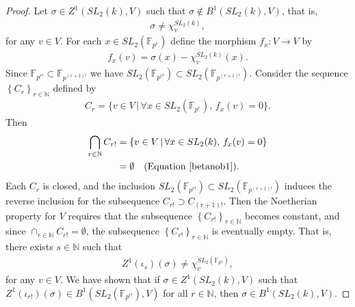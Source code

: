 \begin{proof}
Let $\sigma\in Z^1(SL_2(k), V)$ such that $\sigma \notin B^1(SL_2(k), V)$, that is,
\begin{align}\label{betanob1}
	\sigma \neq \chi^{SL_2(k)}_v,
\end{align}
for any $v \in V$. For each $x\in SL_2(\mathbb{F}_{p^r})$ define the morphism $f_x:V\rightarrow V$ by
	\begin{align*}
		f_x(v) = \sigma(x) - \chi^{SL_2(k)}_v(x).
	\end{align*}
Since $\mathbb{F}_{p^{r!}} \subset \mathbb{F}_{p^{(r+1)!}}$ we have $SL_2(\mathbb{F}_{p^{r!}}) \subset SL_2(\mathbb{F}_{p^{(r+1)!}})$.
Consider the sequence $\left\{C_{r}\right\}_{r \in \mathbb{N}}$ defined by
	\begin{align*}
		C_{r} = \{v \in V \,|\,\forall x\in SL_2(\mathbb{F}_{p^{r}}),\, f_x(v) = 0\}.
	\end{align*}
	Then
\begin{align*}
	\bigcap_{r\in \mathbb{N}}C_{r!} &= \{v \in V \,|\, \forall x \in SL_2(k),\, f_x(v) = 0\} \\
		&= \emptyset \quad(\textrm{Equation \ref{betanob1}}).
\end{align*}
	Each $C_{r}$ is closed, and the inclusion $SL_2(\mathbb{F}_{p^{r!}}) \subset SL_2(\mathbb{F}_{p^{(r+1)!}})$ induces the reverse inclusion for the subsequence $C_{r!} \supset C_{(r+1)!}$.
Then the Noetherian property for $V$ requires that the subsequence $\left\{C_{r!}\right\}_{r \in \mathbb{N}}$ becomes constant, and since $\cap_{r\in\mathbb{N}}C_{r!} = \emptyset$, the subsequence $\left\{C_{r!}\right\}_{r \in \mathbb{N}}$ is eventually empty.
That is, there exists $s\in\mathbb{N}$ such that
	\begin{align*}
		Z^1(\iota_s)(\sigma) \neq \chi_v^{SL_2(\mathbb{F}_{p^{s}})},
	\end{align*}
	for any $v \in V$. We have shown that if $\sigma \in Z^1(SL_2(k), V)$ such that $Z^1(\iota_{r!})(\sigma) \in B^1(SL_2(\mathbb{F}_{p^{r!}}), V)$ for all $r \in \mathbb{N}$, then $\sigma \in B^1(SL_2(k), V)$.


\end{proof}
